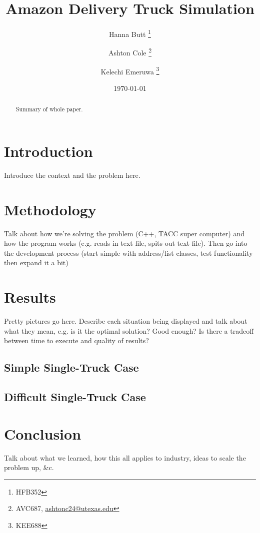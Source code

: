\documentclass[letterpaper]{article}
\title{Amazon Delivery Truck Simulation}
\author{Hanna Butt \thanks{HFB352} \and Ashton Cole \thanks{AVC687, \href{mailto:ashtonc24@utexas.edu}{ashtonc24@utexas.edu}} \and Kelechi Emeruwa \thanks{KEE688}}
\date{\today}
\begin{document}
    \maketitle

    \begin{abstract}
        Summary of whole paper.
    \end{abstract}

    \section{Introduction}
    Introduce the context and the problem here.

    \section{Methodology}
    Talk about how we're solving the problem (C++, TACC super computer) and how the program works (e.g. reads in text file, spits out text file). Then go into the development process (start simple with address/list classes, test functionality then expand it a bit)

    \section{Results}
    Pretty pictures go here. Describe each situation being displayed and talk about what they mean, e.g. is it the optimal solution? Good enough? Is there a tradeoff between time to execute and quality of results?

    \subsection{Simple Single-Truck Case}

    \subsection{Difficult Single-Truck Case}

    \section{Conclusion}
    Talk about what we learned, how this all applies to industry, ideas to scale the problem up, \&c.
\end{document}
